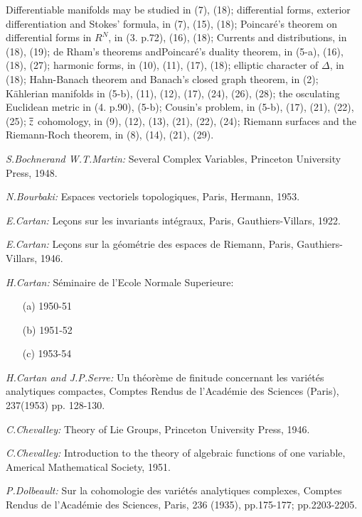 Differentiable manifolds may be studied in (7), (18); differential
forms, exterior differentiation and Stokes' formula, in (7), (15),
(18); Poincar\'e's theorem on differential forms in $R^{N}$, in (3.\@
p.72), (16), (18); Currents and distributions, in (18), (19); de
Rham's theorems and\break Poincar\'e's duality theorem, in (5-a), (16),
(18), (27); harmonic forms, in (10), (11), (17), (18); elliptic
character of $\Delta$, in (18); Hahn-Banach theorem and Banach's
closed graph theorem, in (2); K\"ahlerian manifolds in (5-b), (11),
(12), (17), (24), (26), (28); the osculating Euclidean metric in (4.\@
p.\@ 90), (5-b); Cousin's problem, in (5-b), (17), (21), (22), (25);
$\overline{z}$ cohomology, in (9), (12), (13), (21), (22), (24); Riemann
surfaces and the Riemann-Roch theorem, in (8), (14), (21), (29).

\begin{thebibliography}{99}
 {\em S.\@ Bochner\pageoriginale and W.\@ T.\@ Martin:} Several Complex
  Variables, Princeton University Press, 1948.

 {\em N.\@ Bourbaki:} Espaces vectoriels topologiques,
  Paris, Hermann, 1953.

 {\em E.\@ Cartan:} Le\c{c}ons sur les invariants int\'egraux,
  Paris, Gauthiers-Villars, 1922.

 {\em E.\@ Cartan:} Le\c{c}ons sur la g\'eom\'etrie des
  espaces de Riemann, Paris, Gauthiers-Villars, 1946.

 {\em H.\@ Cartan:} S\'eminaire de l'Ecole Normale
  Superieure:
\begin{itemize}
\item[(a)] 1950-51

\item[(b)] 1951-52

\item[(c)] 1953-54
\end{itemize}

 {\em H.\@ Cartan and J.\@ P.\@ Serre:} Un th\'eor\`eme de
  finitude concernant les vari\'et\'es analytiques compactes, Comptes
  Rendus de l'Acad\'emie des Sciences (Paris), 237(1953) pp.\@
  128-130.

 {\em C.\@ Chevalley:} Theory of Lie Groups, Princeton
  University Press, 1946.

 {\em C.\@ Chevalley:} Introduction to the theory of
  algebraic functions of one variable, Americal Mathematical Society, 1951.

 {\em P.\@ Dolbeault:} Sur la cohomologie des vari\'et\'es
  analytiques complexes, Comptes Rendus de l'Acad\'emie des Sciences,
  Paris, 236 (1935), pp.\@ 175-177; pp.\@ 2203-2205.


\end{thebibliography}
